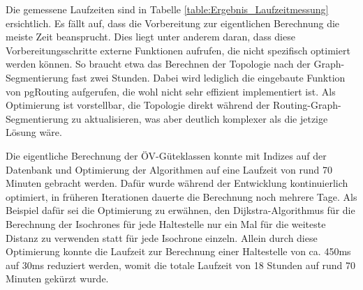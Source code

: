 Die gemessene Laufzeiten sind in Tabelle \ref{table:Ergebnis_Laufzeitmessung} ersichtlich.
Es fällt auf, dass die Vorbereitung zur eigentlichen Berechnung die meiste Zeit beansprucht.
Dies liegt unter anderem daran, dass diese Vorbereitungsschritte externe Funktionen aufrufen, die nicht spezifisch optimiert werden können.
So braucht etwa das Berechnen der Topologie nach der Graph-Segmentierung fast zwei Stunden.
Dabei wird lediglich die eingebaute Funktion von pgRouting aufgerufen, die wohl nicht sehr effizient implementiert ist.
Als Optimierung ist vorstellbar, die Topologie direkt während der Routing-Graph-Segmentierung zu aktualisieren, was aber deutlich komplexer als die jetzige Lösung wäre.

Die eigentliche Berechnung der \acs{ÖV}-Güteklassen konnte mit Indizes auf der Datenbank und Optimierung der Algorithmen auf eine Laufzeit von rund 70 Minuten gebracht werden.
Dafür wurde während der Entwicklung kontinuierlich optimiert, in früheren Iterationen dauerte die Berechnung noch mehrere Tage.
Als Beispiel dafür sei die Optimierung zu erwähnen, den Dijkstra-Algorithmus für die Berechnung der \glspl{Isochrone} für jede Haltestelle nur ein Mal für die weiteste Distanz zu verwenden statt für jede \gls{Isochrone} einzeln.
Allein durch diese Optimierung konnte die Laufzeit zur Berechnung einer Haltestelle von ca. 450ms auf 30ms reduziert werden, womit die totale Laufzeit von 18 Stunden auf rund 70 Minuten gekürzt wurde.


